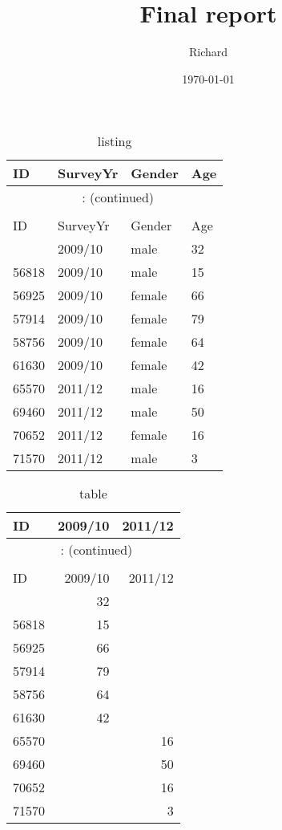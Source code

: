 \documentclass{article}
\title{ Final report }
\author{ Richard }
\date{\today}
\begin{document}
\maketitle
\clearpage
\listoftables
\newpage
\listoffigures
\newpage
\hypertarget{listing}{} 
\begingroup\footnotesize\begin{longtable}{llll}
\caption{listing}\\
\toprule
ID & SurveyYr & Gender & Age\\
\hline
\endfirsthead
\multicolumn{4}{c}{\tablename~\thetable{}: (continued)}\\\\
\toprule
ID & SurveyYr & Gender & Age\\
\hline
\endhead \hline \endfoot \hline
\endlastfoot
55460 & 2009/10 & male & 32 \\
56818 & 2009/10 & male & 15 \\
56925 & 2009/10 & female & 66 \\
57914 & 2009/10 & female & 79 \\
58756 & 2009/10 & female & 64 \\
61630 & 2009/10 & female & 42 \\
65570 & 2011/12 & male & 16 \\
69460 & 2011/12 & male & 50 \\
70652 & 2011/12 & female & 16 \\
71570 & 2011/12 & male &  3 \\
\end{longtable}

\endgroup
\newpage
\hypertarget{table}{} 
\begingroup\footnotesize\begin{longtable}{lrr}
\caption{table}\\
\toprule
ID & 2009/10 & 2011/12 \\
\hline
\endfirsthead
\multicolumn{3}{c}{\tablename~\thetable{}: (continued)}\\\\
\toprule
ID & 2009/10 & 2011/12 \\
\hline
\endhead \hline \endfoot \hline
\endlastfoot
55460 & 32 &  \\
56818 & 15 &  \\
56925 & 66 &  \\
57914 & 79 &  \\
58756 & 64 &  \\
61630 & 42 &  \\
65570 &  & 16 \\
69460 &  & 50 \\
70652 &  & 16 \\
71570 &  & 3 \\
\end{longtable}
\end{document}
